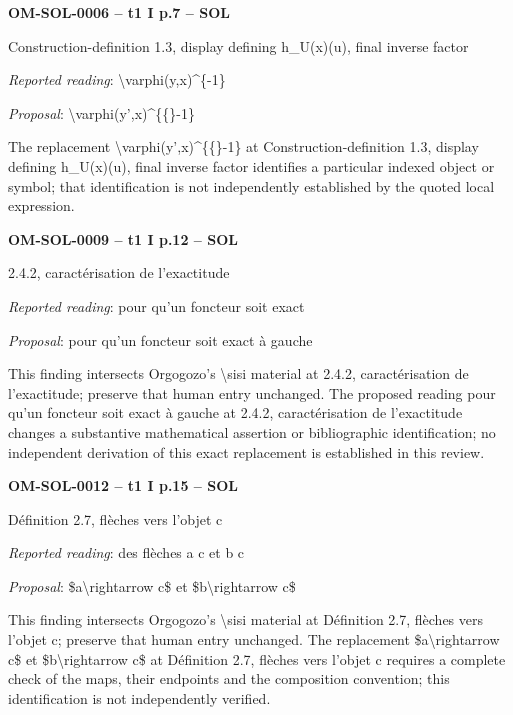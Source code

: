 \par\noindent\textbf{OM-SOL-0006 -- t1 I p.7 -- SOL}\par
Construction-definition 1.3, display defining h\_U(x)(u), final inverse factor\par
\emph{Reported reading}: \textbackslash{}varphi(y,x)\textasciicircum{}\{-1\}\par
\emph{Proposal}: \textbackslash{}varphi(y',x)\textasciicircum{}\{\{\}-1\}\par
The replacement \textbackslash{}varphi(y',x)\textasciicircum{}\{\{\}-1\} at Construction-definition 1.3, display defining h\_U(x)(u), final inverse factor identifies a particular indexed object or symbol; that identification is not independently established by the quoted local expression.\par
\par\noindent\textbf{OM-SOL-0009 -- t1 I p.12 -- SOL}\par
2.4.2, caractérisation de l’exactitude\par
\emph{Reported reading}: pour qu’un foncteur soit exact\par
\emph{Proposal}: pour qu'un foncteur soit exact à gauche\par
This finding intersects Orgogozo's \textbackslash{}sisi material at 2.4.2, caractérisation de l’exactitude; preserve that human entry unchanged. The proposed reading pour qu'un foncteur soit exact à gauche at 2.4.2, caractérisation de l’exactitude changes a substantive mathematical assertion or bibliographic identification; no independent derivation of this exact replacement is established in this review.\par
\par\noindent\textbf{OM-SOL-0012 -- t1 I p.15 -- SOL}\par
Définition 2.7, flèches vers l’objet c\par
\emph{Reported reading}: des flèches a c et b c\par
\emph{Proposal}: \$a\textbackslash{}rightarrow c\$ et \$b\textbackslash{}rightarrow c\$\par
This finding intersects Orgogozo's \textbackslash{}sisi material at Définition 2.7, flèches vers l’objet c; preserve that human entry unchanged. The replacement \$a\textbackslash{}rightarrow c\$ et \$b\textbackslash{}rightarrow c\$ at Définition 2.7, flèches vers l’objet c requires a complete check of the maps, their endpoints and the composition convention; this identification is not independently verified.\par

